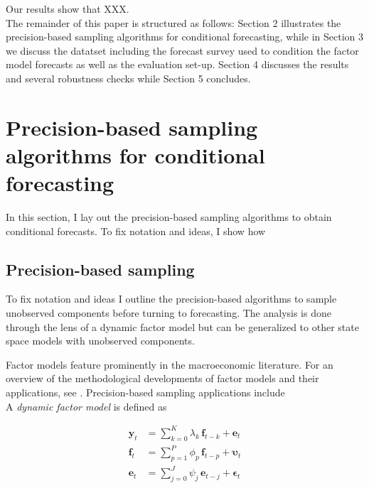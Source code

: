 \documentclass[notitlepage,a4paper,12pt]{article}
\begin{document}
Our results show that XXX.\\

The remainder of this paper is structured as follows: Section 2 illustrates the precision-based sampling algorithms for conditional forecasting, while in Section 3 we discuss the datatset including the forecast survey used to condition the factor model forecasts as well as the evaluation set-up. Section 4 discusses the results and several robustness checks while Section 5 concludes.

\section{Precision-based sampling algorithms for conditional forecasting}\label{sec:precsampler}

In this section, I lay out the precision-based sampling algorithms to obtain conditional forecasts. To fix notation and ideas, I show how 
\subsection{Precision-based sampling}\label{subsec:precsampler}

To fix notation and ideas I outline the precision-based algorithms to sample unobserved components before turning to forecasting. The analysis is done through the lens of a dynamic factor model but can be generalized to other state space models with unobserved components.

Factor models feature prominently in the macroeconomic literature. For an overview of the methodological developments of factor models and their applications, see \citet{stockwatson2016_hbmacro}. Precision-based sampling applications include \citet{chanjeliazkov_2009,mccausland_factor2015,kaufmannschumacher_jae2017,kaufmannschumacher_jectrcs2019}\\

A \textit{dynamic factor model} is defined as

\begin{subequations}
    \label{eqn:factormodel}
    \begin{align}
        \mathbf{y}_t &= \sum_{k=0}^K \lambda_k \, \mathbf{f}_{t-k} + \mathbf{e}_t \label{eqn:facmod_obs}\\ 
        \mathbf{f}_t &= \sum_{p=1}^P \phi_p \, \mathbf{f}_{t-p} + \boldsymbol{\upsilon}_t \label{eqn:facmod_factors}\\
        \mathbf{e}_t &= \sum_{j=0}^J \psi_j \, \mathbf{e}_{t-j} + \boldsymbol{\epsilon}_t \label{eqn:facmod_idios}
    \end{align}
\end{subequations}
\end{document}
